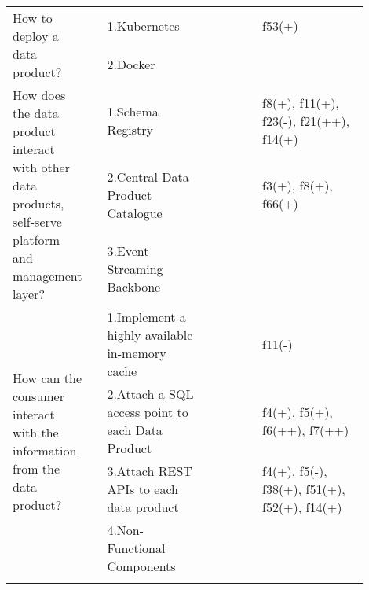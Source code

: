 \begin{tabular}{|p{0.12\linewidth}|p{0.015\linewidth}|p{0.3\linewidth}|p{0.15\linewidth}|p{0.31\linewidth}|}
\multirow{2}{\linewidth}{How to deploy a data product?} &\cellcolor{emerald_shape_3}{} &1.Kubernetes&\cellcolor{emerald_shape_7}{s6, s14, s32, s35, s39, s43, s45, s47} & f53(+)\\
 & \multirow{-2}{\linewidth}{ \cellcolor{emerald_shape_3}{8}} &2.Docker&\cellcolor{emerald_shape_1}{} & \\
\multirow{3}{\linewidth}{How does the data product interact with other data products, self-serve platform and management layer?} &\cellcolor{emerald_shape_6}{} &1.Schema Registry&\cellcolor{emerald_shape_5}{s3, s6, s7, s15, s16, s17, s19, s20, s24, s41, s47, s48, s54, s57} & f8(+), f11(+), f23(-), f21(++), f14(+)\\
 & \cellcolor{emerald_shape_6}{} & 2.Central Data Product Catalogue&\cellcolor{emerald_shape_5}{s5, s9, s15, s20, s23, s31, s32, s39, s40, s42, s45, s46, s47, s48, s49, s53, s54, s55} & f3(+), f8(+), f66(+)\\
 & \multirow{-3}{\linewidth}{ \cellcolor{emerald_shape_6}{37}} &3.Event Streaming Backbone&\cellcolor{emerald_shape_6}{s4, s9, s17, s20, s26, s33, s34, s36, s38, s41, s44, s45, s48, s51, s52, s53, s55, s56, s57} & \\
\multirow{4}{\linewidth}{How can the consumer interact with the information from the data product?} &\cellcolor{emerald_shape_6}{} &1.Implement a highly available in-memory cache&\cellcolor{emerald_shape_3}{s5, s14, s15, s18} & f11(-)\\
 & \cellcolor{emerald_shape_6}{} & 2.Attach a SQL access point to each Data Product&\cellcolor{emerald_shape_6}{s2, s3, s5, s7, s10, s13, s14, s15, s16, s27, s30, s31, s32, s36, s37, s38, s39, s43, s46, s48, s49} & f4(+), f5(+), f6(++), f7(++)\\
 & \cellcolor{emerald_shape_6}{} & 3.Attach REST APIs to each data product&\cellcolor{emerald_shape_7}{s2, s3, s5, s6, s7, s8, s9, s15, s17, s18, s20, s30, s32, s33, s34, s36, s37, s38, s39, s40, s41, s45, s49, s52} & f4(+), f5(-), f38(+), f51(+), f52(+), f14(+)\\
 & \multirow{-4}{\linewidth}{ \cellcolor{emerald_shape_6}{33}} &4.Non-Functional Components&\cellcolor{emerald_shape_1}{} & \\
\hline
\multicolumn{5}{l}{\parbox{\textwidth}{\smallskip
}}
\end{tabular}
